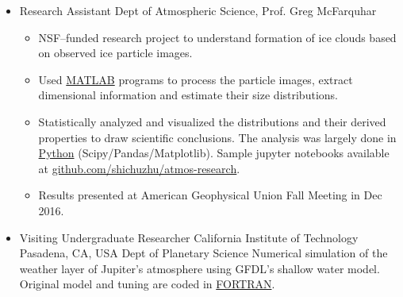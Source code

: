 \documentclass[11pt,a4paper,sans]{moderncv}        %
\begin{document}
\begin{itemize}
	\item{
	      {Research Assistant}
	      {\vspace{-10pt}}
	      {}
	      {Dept of Atmospheric Science, Prof. Greg McFarquhar}
	      {
		      \begin{itemize}
			      \item 
			            NSF--funded research project to understand formation of ice clouds based on observed ice particle images.
			      \item Used \underline{MATLAB} programs to process the particle images, extract dimensional information and estimate their size distributions.
			      \item Statistically analyzed and visualized the distributions and their derived properties to draw scientific conclusions. The analysis was largely done in \underline{Python} (Scipy/Pandas/Matplotlib). Sample jupyter notebooks available at \href{https://github.com/shichuzhu/atmos-research}{\underline{github.com/shichuzhu/atmos-research}}.
			      \item Results presented at American Geophysical Union Fall Meeting in Dec 2016.
		      \end{itemize}
	      }
	      }
	      
	\item{
	      {Visiting Undergraduate Researcher}
	      {California Institute of Technology}
	      {Pasadena, CA, USA}
	      {Dept of Planetary Science}
	      {Numerical simulation of the weather layer of Jupiter's atmosphere using GFDL's shallow water model. Original model and tuning are coded in \underline{FORTRAN}.}
	      }
	      
	      
\end{itemize}

\vspace{-5pt}
\end{document}
